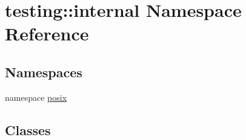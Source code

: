\hypertarget{namespacetesting_1_1internal}{\section{testing\-:\-:internal \-Namespace \-Reference}
\label{d0/da7/namespacetesting_1_1internal}
}
\subsection*{\-Namespaces}
\begin{DoxyCompactItemize}
\item 
namespace \hyperlink{namespacetesting_1_1internal_1_1posix}{posix}
\end{DoxyCompactItemize}
\subsection*{\-Classes}
